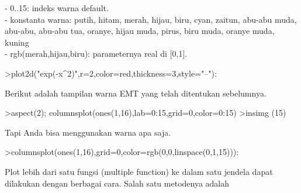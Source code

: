 \documentclass[a4paper,10pt]{article}
\begin{document}
\begin{eulernotebook}
\begin{eulercomment}
\begin{eulercomment}
\begin{eulercomment}
\begin{eulercomment}
\begin{eulercomment}
\begin{eulercomment}
\begin{eulercomment}
\begin{eulercomment}
\begin{eulercomment}
\begin{eulercomment}
\begin{eulercomment}
\begin{eulercomment}
\begin{eulercomment}
\begin{eulercomment}
\begin{eulercomment}
\begin{eulercomment}
\begin{eulercomment}
\begin{eulercomment}
\begin{eulercomment}
\begin{eulercomment}
\begin{eulercomment}
\begin{eulercomment}
\begin{eulercomment}
\begin{eulercomment}
\begin{eulercomment}
\begin{eulercomment}
\begin{eulercomment}
\begin{eulercomment}
\begin{eulercomment}
\begin{eulercomment}
\begin{eulercomment}
\begin{eulercomment}
\begin{eulercomment}
\begin{eulercomment}
\begin{eulercomment}
\begin{eulercomment}
\begin{eulercomment}
- 0..15: indeks warna default.\\
- konstanta warna: putih, hitam, merah, hijau, biru, cyan, zaitun,
abu-abu muda, abu-abu, abu-abu tua, oranye, hijau muda, pirus, biru
muda, oranye muda, kuning\\
- rgb(merah,hijau,biru): parameternya real di [0,1].
\end{eulercomment}
\begin{eulerprompt}
>plot2d("exp(-x^2)",r=2,color=red,thickness=3,style="--"):
\end{eulerprompt}
\begin{eulercomment}
Berikut adalah tampilan warna EMT yang telah ditentukan sebelumnya.
\end{eulercomment}
\begin{eulerprompt}
>aspect(2); columnsplot(ones(1,16),lab=0:15,grid=0,color=0:15)
>insimg (15)
\end{eulerprompt}
\begin{eulercomment}
Tapi Anda bisa menggunakan warna apa saja.
\end{eulercomment}
\begin{eulerprompt}
>columnsplot(ones(1,16),grid=0,color=rgb(0,0,linspace(0,1,15))):
\end{eulerprompt}
\begin{eulercomment}
Plot lebih dari satu fungsi (multiple function) ke dalam satu jendela
dapat dilakukan dengan berbagai cara. Salah satu metodenya adalah

\end{eulercomment}
\end{eulercomment}
\end{eulercomment}
\end{eulercomment}
\end{eulercomment}
\end{eulercomment}
\end{eulercomment}
\end{eulercomment}
\end{eulercomment}
\end{eulercomment}
\end{eulercomment}
\end{eulercomment}
\end{eulercomment}
\end{eulercomment}
\end{eulercomment}
\end{eulercomment}
\end{eulercomment}
\end{eulercomment}
\end{eulercomment}
\end{eulercomment}
\end{eulercomment}
\end{eulercomment}
\end{eulercomment}
\end{eulercomment}
\end{eulercomment}
\end{eulercomment}
\end{eulercomment}
\end{eulercomment}
\end{eulercomment}
\end{eulercomment}
\end{eulercomment}
\end{eulercomment}
\end{eulercomment}
\end{eulercomment}
\end{eulercomment}
\end{eulercomment}
\end{eulercomment}
\end{eulernotebook}
\end{document}
